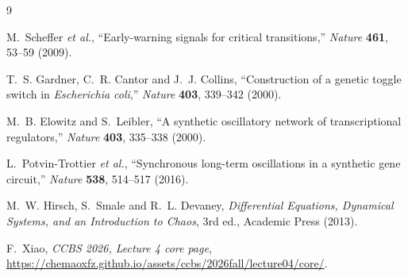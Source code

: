 \documentclass[12pt]{article}
\begin{document}
\begin{thebibliography}{9}

M.~Scheffer \textit{et al.}, ``Early-warning signals for critical transitions,''
\textit{Nature} \textbf{461}, 53--59 (2009).

T.~S. Gardner, C.~R. Cantor and J.~J. Collins, ``Construction of a genetic toggle
switch in \textit{Escherichia coli},'' \textit{Nature} \textbf{403}, 339--342 (2000).

M.~B. Elowitz and S.~Leibler, ``A synthetic oscillatory network of transcriptional
regulators,'' \textit{Nature} \textbf{403}, 335--338 (2000).

L.~Potvin-Trottier \textit{et al.}, ``Synchronous long-term oscillations in a
synthetic gene circuit,'' \textit{Nature} \textbf{538}, 514--517 (2016).

M.~W. Hirsch, S.~Smale and R.~L. Devaney, \textit{Differential Equations, Dynamical
Systems, and an Introduction to Chaos}, 3rd ed., Academic Press (2013).

F.~Xiao, \textit{CCBS 2026, Lecture 4 core page},
\url{https://chemaoxfz.github.io/assets/ccbs/2026fall/lecture04/core/}.

\end{thebibliography}
\end{document}
